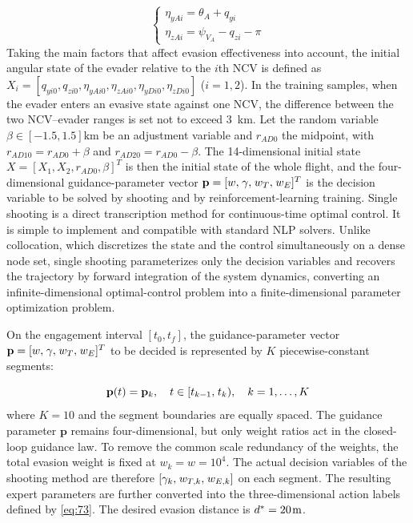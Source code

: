 \begin{equation}
\label{eq:68}
\left\{ {\begin{array}{*{20}{l}}
  {{\eta _{yAi}} = {\theta _A} + {q_{yi}}} \\ 
  {{\eta _{zAi}} = {\psi _{{V_A}}} - {q_{zi}} - \pi } 
\end{array}} \right.
\end{equation}
Taking the main factors that affect evasion effectiveness into account, the initial angular state of the evader relative to the $i$th NCV is defined as ${X_i} = [{q_{yi0}},{q_{zi0}},{\eta _{yAi0}},{\eta _{zAi0}},{\eta _{yDi0}},{\eta _{zDi0}}]$ ($i = 1,2$). In the training samples, when the evader enters an evasive state against one NCV, the difference between the two NCV--evader ranges is set not to exceed 3~km. Let the random variable $\beta  \in [ - 1.5,1.5]{\text{km}}$ be an adjustment variable and ${r_{AD{\text{0}}}}$ the midpoint, with ${r_{AD10}} = {r_{AD0}} + \beta $ and ${r_{AD20}} = {r_{AD0}} - \beta $. The 14-dimensional initial state $X = {[{X_1},{X_2},{r_{AD0}},\beta ]^T}$ is then the initial state of the whole flight, and the four-dimensional guidance-parameter vector ${\mathbf{p}} = {[w,{\kern 1pt} \gamma ,{\kern 1pt} {w_T},{\kern 1pt} {w_E}]^T}$ is the decision variable to be solved by shooting and by reinforcement-learning training.
Single shooting is a direct transcription method for continuous-time optimal control. It is simple to implement and compatible with standard NLP solvers. Unlike collocation, which discretizes the state and the control simultaneously on a dense node set, single shooting parameterizes only the decision variables and recovers the trajectory by forward integration of the system dynamics, converting an infinite-dimensional optimal-control problem into a finite-dimensional parameter optimization problem.

On the engagement interval $[{t_0},{t_f}]$, the guidance-parameter vector ${\mathbf{p}} = {[w,{\kern 1pt} \gamma ,{\kern 1pt} {w_T},{\kern 1pt} {w_E}]^T}$ to be decided is represented by $K$ piecewise-constant segments:

\begin{equation}
\label{eq:69}
{\mathbf{p}}(t) = {{\mathbf{p}}_k},\quad t \in [{t_{k - 1}},{\kern 1pt} {t_k}),\quad k = 1, \ldots ,K
\end{equation}
where $K=10$ and the segment boundaries are equally spaced. The guidance parameter ${\mathbf{p}}$ remains four-dimensional, but only weight ratios act in the closed-loop guidance law. To remove the common scale redundancy of the weights, the total evasion weight is fixed at ${w_k} = w = {10^4}$. The actual decision variables of the shooting method are therefore $[{\gamma _k},{\kern 1pt} {w_{T,k}},{\kern 1pt} {w_{E,k}}]$ on each segment. The resulting expert parameters are further converted into the three-dimensional action labels defined by \eqref{eq:73}. The desired evasion distance is ${d^*} = 20{\kern 1pt} {\text{m}}$.

